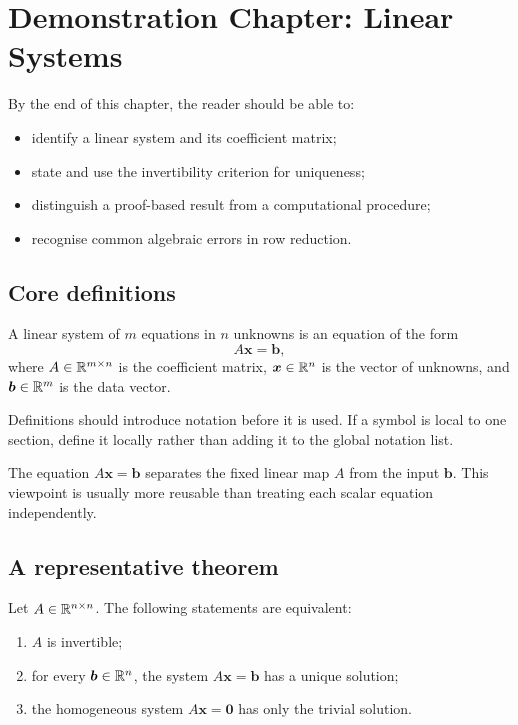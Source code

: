 \chapter{Demonstration Chapter: Linear Systems}

\begin{learningobjectives}
By the end of this chapter, the reader should be able to:
\begin{itemize}
  \item identify a linear system and its coefficient matrix;
  \item state and use the invertibility criterion for uniqueness;
  \item distinguish a proof-based result from a computational procedure;
  \item recognise common algebraic errors in row reduction.
\end{itemize}
\end{learningobjectives}

\section{Core definitions}

\begin{definition}\label{def:linear-system}
A linear system of $m$ equations in $n$ unknowns is an equation of the form
\[
  A\bm{x}=\bm{b},
\]
where $A\in\mathbb{R}^{m\times n}$ is the coefficient matrix,
$\bm{x}\in\mathbb{R}^n$ is the vector of unknowns, and $\bm{b}\in\mathbb{R}^m$ is the data vector.
\end{definition}

\begin{remark}
Definitions should introduce notation before it is used. If a symbol is local to one
section, define it locally rather than adding it to the global notation list.
\end{remark}

\begin{keypoint}
\CoreTag\quad The equation $A\bm{x}=\bm{b}$ separates the fixed linear map $A$
from the input $\bm{b}$. This viewpoint is usually more reusable than treating each
scalar equation independently.
\end{keypoint}

\section{A representative theorem}

\begin{theorem}\label{thm:invertibility-uniqueness}
Let $A\in\mathbb{R}^{n\times n}$. The following statements are equivalent:
\begin{enumerate}
  \item $A$ is invertible;
  \item for every $\bm{b}\in\mathbb{R}^n$, the system $A\bm{x}=\bm{b}$ has a unique solution;
  \item the homogeneous system $A\bm{x}=\bm{0}$ has only the trivial solution.
\end{enumerate}
\end{theorem}

